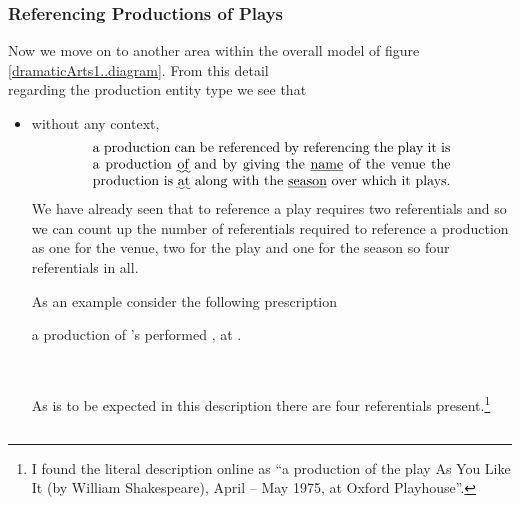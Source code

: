 \subsubsection{Referencing Productions of Plays}
Now we move on to another area within the overall model of figure \ref{dramaticArts1..diagram}. From this detail 
\begin{equation*}

\end{equation*}
regarding the production entity type  we see that
\begin{itemize}
  \item
  without any context, 
  \begin{equation} 
\label{absoluteCharacterReferencing}
\text{\parbox{9cm}{a production can be referenced by referencing the play it is a production \uwave{of} 
  and by giving the \underline{name} of the venue  the production is \uwave{at} along with the \underline{season} 
  over which it plays.}}
\end{equation}
We have already seen that to reference a play requires two referentials and so
we can count up the number of referentials required to reference a production
  as one for the venue, two for the play and one for the season so four referentials in all. 



As an example consider the following prescription
\begin{erquote}
\parbox{9cm}{a production of \mbox{'s} 
 performed \mbox{,} at .}\\
\end{erquote}
As is to be expected in this description there are four referentials present.\footnote{
I found the literal description online as ``a production of the play As You Like It (by William Shakespeare), April – May 1975, at Oxford Playhouse''.  
} 
\end{itemize}

\begin{equation*}

\end{equation*}




